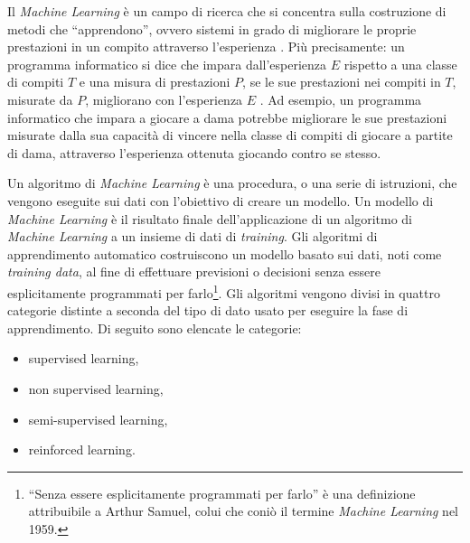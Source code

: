 \documentclass[12pt,italian]{report}
\begin{document}
	Il \textit{Machine Learning} è un campo di ricerca che si concentra sulla costruzione di metodi che ``apprendono'', ovvero sistemi in grado di migliorare le proprie prestazioni in un compito attraverso l'esperienza \cite{10.5555/541177}. Più precisamente: un programma informatico si dice che impara dall'esperienza $E$ rispetto a una classe di compiti $T$ e una misura di prestazioni $P$, se le sue prestazioni nei compiti in $T$, misurate da $P$, migliorano con l'esperienza $E$ \cite{10.5555/541177}.
	Ad esempio, un programma informatico che impara a giocare a dama potrebbe migliorare le sue prestazioni misurate dalla sua capacità di vincere nella classe di compiti di giocare a partite di dama, attraverso l'esperienza ottenuta giocando contro se stesso.	
	
	Un algoritmo di \textit{Machine Learning} è una procedura, o una serie di istruzioni, che vengono eseguite sui dati con l'obiettivo di creare un modello. Un modello di \textit{Machine Learning} è il risultato finale dell'applicazione di un algoritmo di \textit{Machine Learning} a un insieme di dati di \textit{training}.
	Gli algoritmi di apprendimento automatico costruiscono un modello basato sui dati, noti come \textit{training data}, al fine di effettuare previsioni o decisioni senza essere esplicitamente programmati per farlo\footnote{``Senza essere esplicitamente programmati per farlo'' è una definizione attribuibile a Arthur Samuel, colui che coniò il termine \textit{Machine Learning} nel 1959.}. 
	Gli algoritmi vengono divisi in quattro categorie distinte a seconda del tipo di dato usato per eseguire la fase di apprendimento. Di seguito sono elencate le categorie:
	\begin{itemize}
		\item supervised learning,
		\item non supervised learning,
		\item semi-supervised learning,
		\item reinforced learning.
	\end{itemize}
	
\end{document}
